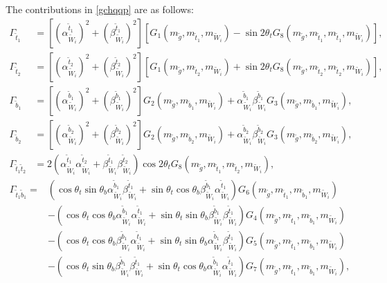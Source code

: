 \documentclass[final,3p,times,pdflatex]{elsarticle}
\begin{document}
The contributions in \eqref{gchqqp} are as follows:
\begin{align}
\Gamma_{\tilde{t}_1} &= [(\alpha_{\tilde{W}_i}^{\tilde{t}_1})^2 + (\beta_{\tilde{W}_i}^{\tilde{t}_1})^2]\left[G_{1}(m_{\tilde{g}},m_{\tilde{t}_1},m_{\tilde{W}_i}) - \sin 2\theta_t G_{8} (m_{\tilde{g}},m_{\tilde{t}_1},m_{\tilde{t}_1}, m_{\tilde{W}_i})\right], \\
\Gamma_{\tilde{t}_2} &= [(\alpha_{\tilde{W}_i}^{\tilde{t}_2})^2 + (\beta_{\tilde{W}_i}^{\tilde{t}_2})^2]\left[G_{1}(m_{\tilde{g}},m_{\tilde{t}_2},m_{\tilde{W}_i}) + \sin 2\theta_t G_{8} (m_{\tilde{g}},m_{\tilde{t}_2},m_{\tilde{t}_2}, m_{\tilde{W}_i})\right], \\
\Gamma_{\tilde{b}_1} &= [(\alpha_{\tilde{W}_i}^{\tilde{b}_1})^2 + (\beta_{\tilde{W}_i}^{\tilde{b}_1})^2]G_{2}(m_{\tilde{g}},m_{\tilde{b}_1},m_{\tilde{W}_i}) + \alpha_{\tilde{W}_i}^{\tilde{b}_1} \beta_{\tilde{W}_i}^{\tilde{b}_1} G_{3} (m_{\tilde{g}},m_{\tilde{b}_1}, m_{\tilde{W}_i}), \\
\Gamma_{\tilde{b}_2} &= [(\alpha_{\tilde{W}_i}^{\tilde{b}_2})^2 + (\beta_{\tilde{W}_i}^{\tilde{b}_2})^2]G_{2}(m_{\tilde{g}},m_{\tilde{b}_2},m_{\tilde{W}_i}) + \alpha_{\tilde{W}_i}^{\tilde{b}_2} \beta_{\tilde{W}_i}^{\tilde{b}_2} G_{3} (m_{\tilde{g}},m_{\tilde{b}_2}, m_{\tilde{W}_i}), \\
\Gamma_{\tilde{t}_1 \tilde{t}_2} &= 2(\alpha_{\tilde{W}_i}^{\tilde{t}_1} \alpha_{\tilde{W}_i}^{\tilde{t}_2} + \beta_{\tilde{W}_i}^{\tilde{t}_1} \beta_{\tilde{W}_i}^{\tilde{t}_2})\cos 2\theta_t G_{8}(m_{\tilde{g}},m_{\tilde{t}_1},m_{\tilde{t}_2},m_{\tilde{W}_i}),
\end{align}
\begin{equation}
\begin{aligned}
\Gamma_{\tilde{t}_1 \tilde{b}_1} = & (\cos\theta_t \sin\theta_b \alpha_{\tilde{W}_i}^{\tilde{b}_1} \beta_{\tilde{W}_i}^{\tilde{t}_1} + \sin\theta_t \cos\theta_b \beta_{\tilde{W}_i}^{\tilde{b}_1} \alpha_{\tilde{W}_i}^{\tilde{t}_1})G_{6}(m_{\tilde{g}},m_{\tilde{t}_1},m_{\tilde{b}_1},m_{\tilde{W}_i}) \\ & - (\cos\theta_t \cos\theta_b \alpha_{\tilde{W}_i}^{\tilde{b}_1}\alpha_{\tilde{W}_i}^{\tilde{t}_1} + \sin\theta_t \sin\theta_b \beta_{\tilde{W}_i}^{\tilde{b}_1}\beta_{\tilde{W}_i}^{\tilde{t}_1}) G_{4}(m_{\tilde{g}},m_{\tilde{t}_1}, m_{\tilde{b}_1},m_{\tilde{W}_i}) \\ & - (\cos\theta_t \cos\theta_b \beta_{\tilde{W}_i}^{\tilde{b}_1} \alpha_{\tilde{W}_i}^{\tilde{t}_1} + \sin\theta_t \sin\theta_b \alpha_{\tilde{W}_i}^{\tilde{b}_1} \beta_{\tilde{W}_i}^{\tilde{t}_1})G_{5}(m_{\tilde{g}},m_{\tilde{t}_1}, m_{\tilde{b}_1}, m_{\tilde{W}_i}) \\ & - (\cos\theta_t\sin\theta_b \beta_{\tilde{W}_i}^{\tilde{b}_1} \beta_{\tilde{W}_i}^{\tilde{t}_1} + \sin\theta_t \cos\theta_b \alpha_{\tilde{W}_i}^{\tilde{b}_1} \alpha_{\tilde{W}_i}^{\tilde{t}_1})G_{7}(m_{\tilde{g}},m_{\tilde{t}_1},m_{\tilde{b}_1},m_{\tilde{W}_i}),
\end{aligned}
\end{equation}
\end{document}
